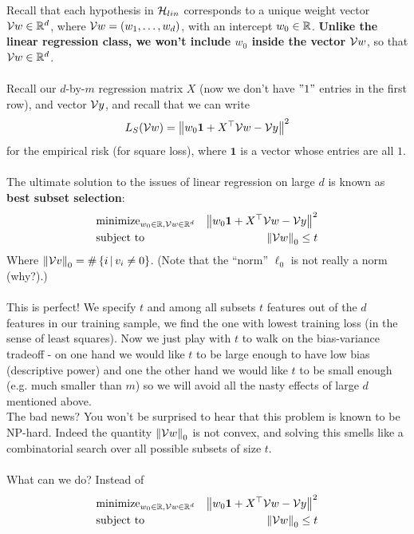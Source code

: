     Recall that each hypothesis in $\mathcal{H}_{lin}$ corresponds to a unique weight
    vector $\mathcal{V}{w}\in\mathbb{R}^{d}$, where $\mathcal{V}{w}=(w_1,\ldots,w_d)$, with an intercept
    $w_0\in\mathbb{R}$. {\bf Unlike the linear regression class, we won't include $w_0$
    inside the vector $\mathcal{V}{w}$}, so that $\mathcal{V}{w}\in\mathbb{R}^d$.
   \\~\\ 
    Recall our $d$-by-$m$ regression matrix $X$ (now we don't have $"1"$ entries in the first
row), and vector $\mathcal{V}{y}$, and recall that we can write
\[
  L_S(\mathcal{V}{w}) = \left\|  w_0\mathbf{1} + X^{\top}\mathcal{V}{w} -\mathcal{V}{y}\right\|^2
\]
for the empirical risk (for square loss), where $\mathbf{1}$ is a vector whose entries are all $1$. 
\\~\\
    The ultimate solution to the issues of linear regression on large $d$
    is known as {\bf best subset selection}:
\begin{eqnarray*}
  & \text{minimize}_{w_0\in\mathbb{R},\mathcal{V}{w}\in\mathbb{R}^{d}}   &  \left\|   w_0\mathbf{1} + X^{\top}\mathcal{V}{w} -\mathcal{V}{y}  \right\|^2 \\
      & \text{subject to} &  \left\| \mathcal{V}{w}\right\|_0 \leq t
    \end{eqnarray*}
    Where $\left\| \mathcal{V}{v}\right\|_0 = \#\left\{ i\,|\, v_i\neq 0 \right\}$. 
    (Note that the ``norm'' $\ell_0$ is not really a norm (why?).)
\\~\\
This is perfect! We specify $t$ and among all subsets $t$ features out of the $d$
features in our training sample, we find the one with lowest training loss (in the sense of
least squares). Now we just play with $t$ to walk on the bias-variance tradeoff
- on one hand we would like $t$ to be large enough to have low bias (descriptive
power) and one the other hand we would like $t$ to be small enough (e.g. much smaller than
$m$) so we will avoid all the nasty effects of large $d$ mentioned above. 
~\\ The bad news? You won't be surprised to hear that this problem is known to
be NP-hard. Indeed the quantity $\left\| \mathcal{V}{w}\right\|_0$ is not convex, and solving this
smells like a combinatorial search over all possible subsets of size $t$.
\\~\\
What can we do?
Instead of 
\begin{eqnarray*}
  & \text{minimize}_{w_0\in\mathbb{R},\mathcal{V}{w}\in\mathbb{R}^{d}}   &  \left\|   w_0\mathbf{1} + X^{\top}\mathcal{V}{w} -\mathcal{V}{y}  \right\|^2 \\
      & \text{subject to} &  \left\| \mathcal{V}{w}\right\|_0 \leq t
    \end{eqnarray*}
